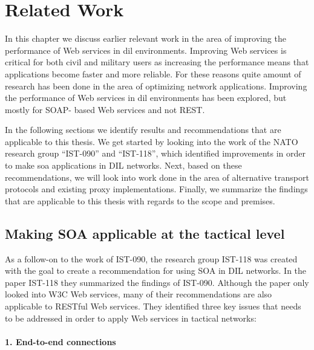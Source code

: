 \chapter{Related Work}

In this chapter we discuss earlier relevant work in the area of improving the
performance of Web services in \gls{dil} environments. Improving Web services
is critical for both civil and military users as increasing the performance
means that applications become faster and more reliable. For these reasons
quite amount of research has been done in the area of optimizing network
applications. Improving the performance of Web services in \gls{dil}
environments has been explored, but mostly for SOAP- based Web services and
not REST.

In the following sections we identify results and recommendations that are
applicable to this thesis. We get started by looking into the work of the NATO
research group ``IST-090'' and ``IST-118'', which identified improvements in
order to make \gls{soa} applications in DIL networks. Next, based on these
recommendations, we will look into work done in the area of alternative
transport protocols and existing proxy implementations.  Finally, we summarize
the findings that are applicable to this thesis with regards to the scope and
premises.

\section{Making SOA applicable at the tactical level}

As a follow-on to the work of IST-090, the research group IST-118 was created
with the goal to create a recommendation for using SOA in DIL networks. In the
paper IST-118\cite{ist-118} they summarized the findings of IST-090. Although
the paper only looked into W3C Web services, many of their recommendations
are also applicable to RESTful Web services. They identified three key issues
that needs to be addressed in order to apply Web services in tactical
networks\cite{ist-090, ist-118}:

\label{section:DIL-problems}

\subsubsection{1. End-to-end connections}

